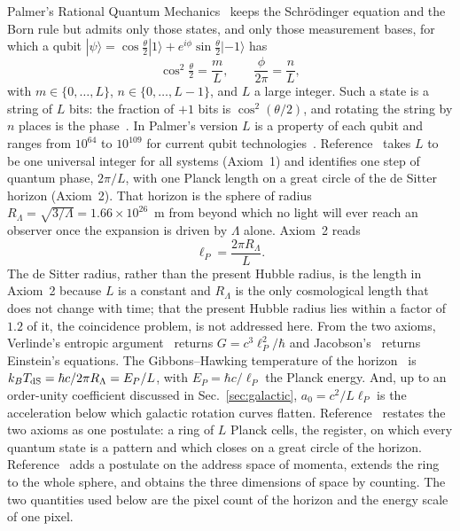 \documentclass[aps,prd,twocolumn,superscriptaddress,nofootinbib,showkeys]{revtex4-2}
\begin{document}
Palmer's Rational Quantum Mechanics~\cite{palmer2020,palmer2026} keeps the Schr\"odinger equation and the Born rule but admits only those states, and only those measurement bases, for which a qubit $|\psi\rangle=\cos\frac{\theta}{2}|1\rangle+e^{i\phi}\sin\frac{\theta}{2}|{-1}\rangle$ has
\begin{equation}
\cos^2\tfrac{\theta}{2} = \frac{m}{L},\qquad \frac{\phi}{2\pi}=\frac{n}{L},
\label{eq:raqm}
\end{equation}
with $m\in\{0,\dots,L\}$, $n\in\{0,\dots,L-1\}$, and $L$ a large integer. Such a state is a string of $L$ bits: the fraction of $+1$ bits is $\cos^2(\theta/2)$, and rotating the string by $n$ places is the phase~\cite{palmer2026}. In Palmer's version $L$ is a property of each qubit and ranges from $10^{64}$ to $10^{109}$ for current qubit technologies~\cite{palmer2026}. Reference~\cite{korytko2026} takes $L$ to be one universal integer for all systems (Axiom~1) and identifies one step of quantum phase, $2\pi/L$, with one Planck length on a great circle of the de Sitter horizon (Axiom~2). That horizon is the sphere of radius $R_\Lambda=\sqrt{3/\Lambda} = 1.66\times10^{26}$~m from beyond which no light will ever reach an observer once the expansion is driven by $\Lambda$ alone. Axiom~2 reads
\begin{equation}
\ell_P = \frac{2\pi R_\Lambda}{L}.
\label{eq:axiom2}
\end{equation}
The de Sitter radius, rather than the present Hubble radius, is the length in Axiom~2 because $L$ is a constant and $R_\Lambda$ is the only cosmological length that does not change with time; that the present Hubble radius lies within a factor of $1.2$ of it, the coincidence problem, is not addressed here. From the two axioms, Verlinde's entropic argument~\cite{verlinde2011} returns $G=c^3\ell_P^2/\hbar$ and Jacobson's~\cite{jacobson1995} returns Einstein's equations. The Gibbons--Hawking temperature of the horizon~\cite{gibbons1977} is $k_BT_{\rm dS}=\hbar c/2\pi R_\Lambda = E_P/L$, with $E_P = \hbar c/\ell_P$ the Planck energy. And, up to an order-unity coefficient discussed in Sec.~\ref{sec:galactic}, $a_0=c^2/L\ell_P$ is the acceleration below which galactic rotation curves flatten. Reference~\cite{korytko2026c} restates the two axioms as one postulate: a ring of $L$ Planck cells, the register, on which every quantum state is a pattern and which closes on a great circle of the horizon. Reference~\cite{korytko2026d} adds a postulate on the address space of momenta, extends the ring to the whole sphere, and obtains the three dimensions of space by counting. The two quantities used below are the pixel count of the horizon and the energy scale of one pixel.
\end{document}
